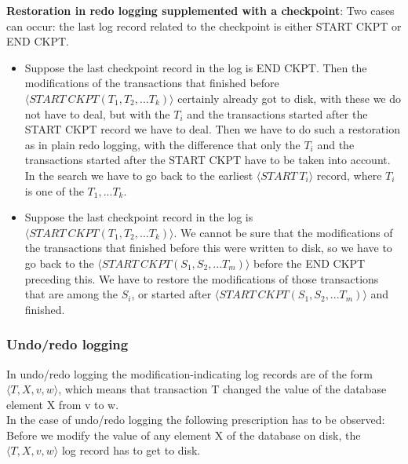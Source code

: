 \documentclass[margin=0px]{article}
\begin{document}
\noindent \textbf{Restoration in redo logging supplemented with a checkpoint}:
Two cases can occur: the last log record related to the checkpoint is either START CKPT or END CKPT.

\begin{itemize}
    \item	Suppose the last checkpoint record in the log is END CKPT. Then the\\
          modifications of the transactions that finished before $\langle START \ CKPT(T_{1},T_{2},...T_{k}) \rangle$ certainly already got to disk, with these we do not have to deal, but
          with the $T_{i}$ and the transactions started after the START CKPT record we have to deal. Then we have to do such a restoration
          as in plain redo logging, with the difference that only the $T_{i}$ and the transactions started after the START CKPT
          have to be taken into account. In the search we have to go back to the earliest $\langle START \ T_{i}\rangle$ record, where $T_{i}$ is
          one of the $T_{1},...T_{k}$.

    \item	Suppose the last checkpoint record in the log is $\langle START \ CKPT(T_{1},T_{2},...T_{k}) \rangle$.
          We cannot be sure that the modifications of the transactions that finished before this were written to disk, so we have to go back to the
          $\langle START \ CKPT(S_{1},S_{2},...T_{m}) \rangle$ before the END CKPT preceding this. We have to restore the modifications of those
          transactions that are among the $S_{i}$, or started after $\langle START \ CKPT(S_{1},S_{2},...T_{m}) \rangle$
          and finished.
\end{itemize}

\subsubsection{Undo/redo logging}

In undo/redo logging the modification-indicating log records are of the form $\langle T,X,v,w \rangle$, which means that transaction T
changed the value of the database element X from v to w.\\

In the case of undo/redo logging the following prescription has to be observed: Before we modify the value of any element X of the database on disk,
the $\langle T,X,v,w \rangle$ log record has to get to disk.\\
\end{document}
